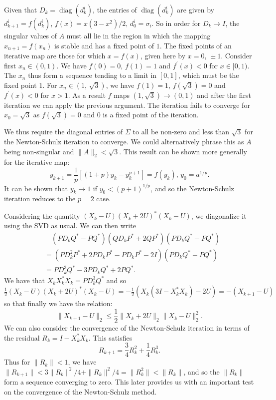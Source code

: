 \documentclass[12pt]{article}
\def\norm#1{\|#1\|}
\def\diag{\mathop{\mathrm{diag}}}     %
\begin{document}
Given that $D_k = \diag(d_k^i)$, the entries of $\diag(d_k^{i})$ are given by
$d^{i}_{k+1} = f(d^{i}_k)$, $f(x) = x(3-x^2)/2\text{, } d_0^{i} = \sigma_i$. So
in order for $D_k \to I$, the singular values of $A$ must all lie in the region
in which the mapping $x_{n+1} = f(x_n)$ is stable and has a fixed point of $1$.
The fixed points of an iterative map are those for which $x = f(x)$, given here
by $x = 0\text{, }\pm 1$.
Consider first $x_n \in (0, 1)$.
We have $f(0) = 0\text{, } f(1) = 1$ and $f^{\prime}(x) < 0$ for $x \in [0, 1)$.
The $x_n$ thus form a sequence tending to a limit in $[0, 1]$,
which must be the fixed point $1$.
For $x_n \in (1\text{, } \sqrt{3})$, we have $f(1) = 1$,
$f(\sqrt{3}) = 0$ and $f^{\prime}(x) < 0$ for $x > 1$.
As a result $f$ maps $(1, \sqrt{3}) \to (0, 1)$ and after the first iteration
we can apply the previous argument.
The iteration fails to converge for $x_0 = \sqrt{3}$ as $f(\sqrt{3}) = 0$ and
$0$ is a fixed point of the iteration.

We thus require the diagonal entries of $\Sigma$ to all be non-zero and less
than $\sqrt{3}$ for the Newton-Schulz iteration to converge. We could
alternatively phrase this as $A$ being non-singular and $\norm{A}_2 < \sqrt{3}$.
This result can be shown more generally for the iterative map:
\begin{equation}
  y_{k+1} = \frac{1}{p}[(1+p)y_k - y_k^{p+1}] = f(y_k)
  \text{, } y_0 = a^{1/p}\text{.}  
\end{equation}
It can be shown \cite[p.~182]{Higham:2008:FM} that $y_k \to 1$ if $y_0 < (p+1)^{1/p}$,
and so the Newton-Schulz iteration reduces to the $p=2$ case.

Considering the quantity $(X_k - U)(X_k+2U)^*(X_k-U)$, we diagonalize it using
the SVD as usual. We can then write
\begin{align*}
  &\quad(PD_kQ^* - PQ^*)(QD_kP^* + 2QP^*)(PD_kQ^* - PQ^*)\\
  & = (PD_k^2P^* + 2PD_kP^* - PD_kP^* - 2I)(PD_kQ^* - PQ^*)\\
  & = PD_k^3Q^* - 3PD_kQ^* + 2PQ^*\text{.}
\end{align*}
We have that $X_kX_k^*X_k = PD_k^3Q^*$ and so
\begin{math}
  \frac{1}{2}(X_k - U)(X_k+2U)^*(X_k-U) = -\frac{1}{2}(X_k(3I-X_k^*X_k) - 2U) = -(X_{k+1}-U)
\end{math}
so that finally we have the relation:
\begin{equation}
  \norm{X_{k+1}-U}_2 \leq \frac{1}{2}
  \norm{X_k+2U}_2\norm{X_k - U}_2^2\text{.}
\end{equation}
We can also consider the convergence of the Newton-Schulz iteration in
terms of the residual $R_k = I-X_k^*X_k$. This satisfies
\cite[p.~218]{Higham:2008:FM}
\begin{equation*}
  R_{k+1} = \frac{3}{4}R_k^2 + \frac{1}{4}R_k^3\text{.}
\end{equation*}
Thus for $\norm{R_k} < 1$, we have
$\norm{R_{k+1}} < 3\norm{R_k}^2/4 + \norm{R_k}^2/4 = \norm{R_k^2} < \norm{R_k}$,
and so the $\|R_k\|$ form a sequence converging to zero. This later provides us
with an important test on the convergence of the Newton-Schulz method.
\end{document}
